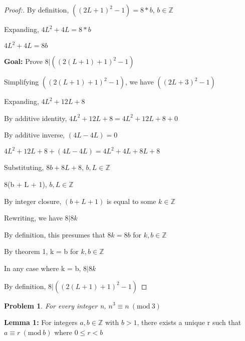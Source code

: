 \documentclass[12pt]{article}
\newtheorem{theorem}{Problem}[section]
\newcommand{\Mod}[1]{\ (\mathrm{mod}\ #1)}
\begin{document}
\begin{proof}[Proof:]
    By definition, $((2L + 1)^2 - 1) = 8 * b$, $b \in \mathbb{Z}$

    Expanding, $4L^2 + 4L = 8 * b$

    $4L^2 + 4L = 8b$

    \medskip

    \textbf{Goal:} Prove $8 | ((2(L + 1) + 1)^2 - 1)$

    Simplifying $((2(L + 1) + 1)^2 - 1)$, we have $((2L + 3)^2 - 1)$

    Expanding, $4L^2 + 12L + 8$

    By additive identity, $4L^2 + 12L + 8 = 4L^2 + 12L + 8 + 0$

    By additive inverse, $(4L - 4L) = 0$

    $4L^2 + 12L + 8 + (4L - 4L) = 4L^2 + 4L + 8L + 8$

    Substituting, $8b + 8L + 8$, $b, L \in \mathbb{Z}$

    8(b + L + 1), $b, L \in \mathbb{Z}$

    By integer closure, $(b + L + 1)$ is equal to some $ k \in \mathbb{Z}$

    Rewriting, we have $8 | 8k$

    By definition, this presumes that $8k = 8b$ for $k, b \in \mathbb{Z}$

    By theorem 1, k = b for $k, b \in \mathbb{Z}$

    In any case where k = b, $8 | 8k$

    By definition, $8 | ((2(L + 1) + 1)^2 - 1)$
    
\end{proof}

\newpage

\begin{theorem}
    For every integer n, $n^3 \equiv n \Mod{3}$
\end{theorem}

\textbf{Lemma 1:} For integers $a, b \in \mathbb{Z}$ with $b > 1$, there exists a unique r such that $a \equiv r \Mod{b}$ where $0 \le r < b$
\end{document}
